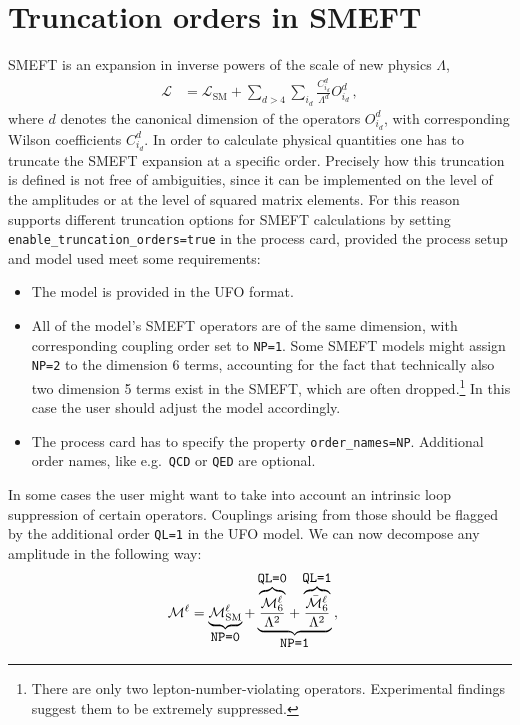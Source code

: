 \section{Truncation orders in SMEFT}
\label{sec:SMEFTtruncations}
SMEFT is an expansion in inverse powers of the scale of new physics $\Lambda$,
\begin{align}
   \mathcal{L} &= \mathcal{L}_\mathrm{SM} + \sum_{d>4}\sum_{i_d}\frac{C^d_{i_d}}{\Lambda^d}O^d_{i_d}\,,\label{eq:SMEFTLag}
\end{align}
where $d$ denotes the canonical dimension of the operators $O^d_{i_d}$, with corresponding Wilson coefficients $C^d_{i_d}$. In order to calculate physical quantities one has to truncate the SMEFT expansion at a specific order. Precisely how this truncation is defined is not free of ambiguities, since it can be implemented on the level of the amplitudes or at the level of squared matrix elements. For this reason \gosam supports different truncation options for SMEFT calculations by setting \texttt{enable\_truncation\_orders=true} in the process card, provided the process setup and model used meet some requirements:
\begin{itemize}
   \item The model is provided in the UFO format.
   \item All of the model's SMEFT operators are of the same dimension, with corresponding coupling order set to \texttt{NP=1}. Some SMEFT models might assign \texttt{NP=2} to the dimension 6 terms, accounting for the fact that technically also two dimension 5 terms exist in the SMEFT, which are often dropped.\footnote{There are only two lepton-number-violating operators. Experimental findings suggest them to be extremely suppressed.} In this case the user should adjust the model accordingly.
   \item The \gosam process card has to specify the property \texttt{order\_names=NP}. Additional order names, like e.g.\ \texttt{QCD} or \texttt{QED} are optional.
\end{itemize}
%
In some cases the user might want to take into account an intrinsic loop suppression of certain operators. Couplings arising from those should be flagged by the additional order \texttt{QL=1} in the UFO model. We can now decompose any amplitude in the following way:
\begin{align}\label{eq:amp_truncation}
   \mathcal{M}^\ell &= \underbrace{\mathcal{M}^\ell_\mathrm{SM}}_{\displaystyle\texttt{NP=0}} + \underbrace{\overbrace{\frac{\mathcal{M}^\ell_6}{\Lambda^2}}^{\displaystyle\texttt{QL=0}}  + \overbrace{\frac{\bar{\mathcal{M}}^\ell_6}{\Lambda^2}}^{\displaystyle\texttt{QL=1}}}_{\displaystyle\texttt{NP=1}}\,,
\end{align}
